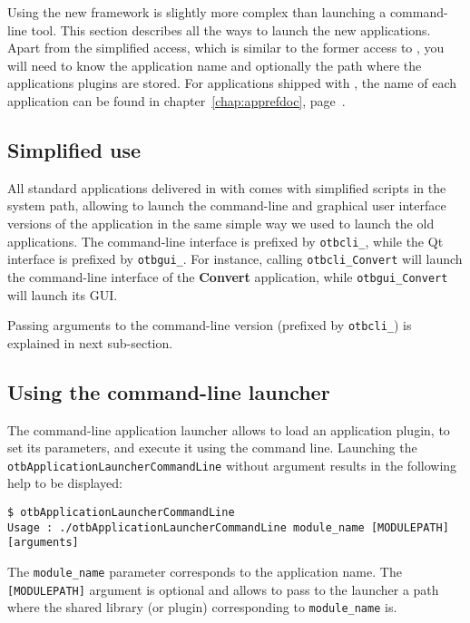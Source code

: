 Using the new \app framework is slightly more complex than launching a
command-line tool. This section describes all the ways to launch the
new applications. Apart from the simplified access, which is similar
to the former access to \app, you will need to know the application
name and optionally the path where the applications plugins are stored.
For applications shipped with \otb, the name of each
application can be found in chapter~\ref{chap:apprefdoc},
page~\pageref{chap:apprefdoc}.

\subsection{Simplified use}

All standard applications delivered in with \otb comes with simplified
scripts in the system path, allowing to launch the command-line and
 graphical user interface versions of the application in the same simple way
 we used to launch the old applications. The command-line interface is prefixed by
\verb?otbcli_?, while the Qt interface is prefixed by
\verb?otbgui_?. For instance, calling \verb?otbcli_Convert? will
launch the command-line interface of the \textbf{Convert} application,
while \verb?otbgui_Convert? will launch its GUI.


Passing arguments to the command-line version (prefixed by
\verb?otbcli_?) is explained in next sub-section.

\subsection{Using the command-line launcher}

The command-line application launcher allows to load an application
plugin, to set its parameters, and execute it using the command
line. Launching the \verb?otbApplicationLauncherCommandLine?
without argument results in the following help to be displayed:

\begin{verbatim}
$ otbApplicationLauncherCommandLine
Usage : ./otbApplicationLauncherCommandLine module_name [MODULEPATH] [arguments]
\end{verbatim}

The \verb?module_name? parameter corresponds to the application
name. The \verb?[MODULEPATH]? argument is optional and allows
to pass to the launcher a path where the shared library (or plugin)
corresponding to \verb?module_name? is.

